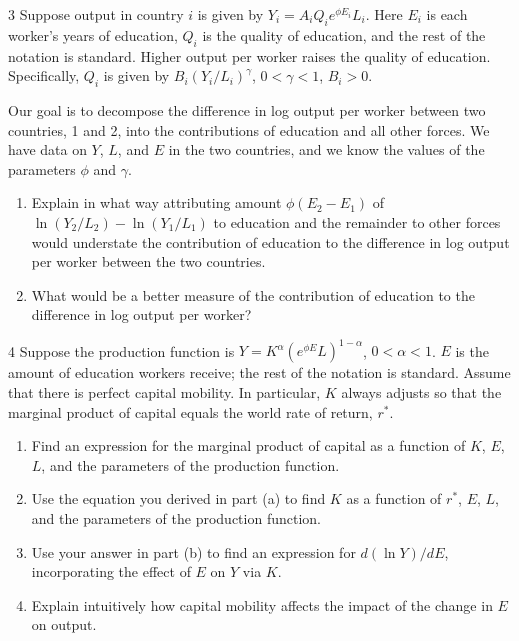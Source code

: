 \begin{problem}{3}
Suppose output in country \(i\) is given by \(Y_i=A_iQ_i e^{\phi E_i}L_i\). Here \(E_i\) is each worker's years of education, \(Q_i\) is the quality of education, and the rest of the notation is standard. Higher output per worker raises the quality of education. Specifically, \(Q_i\) is given by \(B_i\left(Y_i/L_i\right)^\gamma\), \(0<\gamma<1\), \(B_i>0\).

Our goal is to decompose the difference in log output per worker between two countries, 1 and 2, into the contributions of education and all other forces. We have data on \(Y\), \(L\), and \(E\) in the two countries, and we know the values of the parameters \(\phi\) and \(\gamma\).
\begin{enumerate}[label=(\alph*)]
    \item Explain in what way attributing amount \(\phi\left(E_2-E_1\right)\) of \(\ln\left(Y_2/L_2\right)-\ln\left(Y_1/L_1\right)\) to education and the remainder to other forces would understate the contribution of education to the difference in log output per worker between the two countries.
    \item What would be a better measure of the contribution of education to the difference in log output per worker?
\end{enumerate}
\end{problem}

\begin{problem}{4}
Suppose the production function is \(Y=K^\alpha\left(e^{\phi E}L\right)^{1-\alpha}\), \(0<\alpha<1\). \(E\) is the amount of education workers receive; the rest of the notation is standard. Assume that there is perfect capital mobility. In particular, \(K\) always adjusts so that the marginal product of capital equals the world rate of return, \(r^*\).
\begin{enumerate}[label=(\alph*)]
    \item Find an expression for the marginal product of capital as a function of \(K\), \(E\), \(L\), and the parameters of the production function.
    \item Use the equation you derived in part (a) to find \(K\) as a function of \(r^*\), \(E\), \(L\), and the parameters of the production function.
    \item Use your answer in part (b) to find an expression for \(d\left(\ln Y\right)/dE\), incorporating the effect of \(E\) on \(Y\) via \(K\).
    \item Explain intuitively how capital mobility affects the impact of the change in \(E\) on output.
\end{enumerate}
\end{problem}

